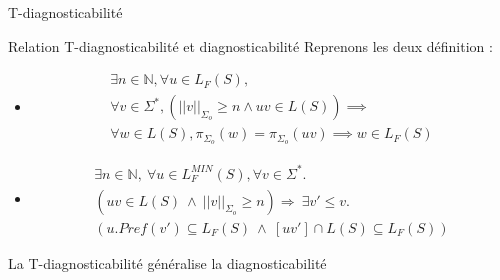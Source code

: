 \documentclass[11pt]{beamer}
\begin{document}
\begin{section}{T-diagnosticabilit\'e}
  \begin{frame}{Relation T-diagnosticabilit\'e et diagnosticabilit\'e}
    Reprenons les deux d\'efinition :
    \begin{itemize}
    \item $$\begin{array}{l}
      \exists n \in \mathbb N, \forall u \in L_F(S),\\
      \forall v \in \Sigma^*, \left(||v||_{\Sigma_o} \ge n \land uv \in  L(S)\right) \implies\\
      \forall w \in L(S), \pi_{\Sigma_o}(w)=\pi_{\Sigma_o}(uv) \implies w \in L_F(S)
    \end{array}$$
    \item $$\begin{array}{l}
      \exists n \in \mathbb{N}, \ \forall u \in L^{MIN}_F(S), \forall v \in \Sigma^*.\\
      (uv \in L(S) \ \wedge \  ||v||_{\Sigma_o}\geq n) \Rightarrow \ \exists v' \leq v. \\
      (u.Pref(v') \subseteq L_F(S) \ \wedge \  [uv'] \cap L(S) \subseteq L_F(S))
    \end{array}$$

    \end{itemize}

    La T-diagnosticabilité généralise la diagnosticabilité

  \end{frame}
\end{section}
\end{document}

